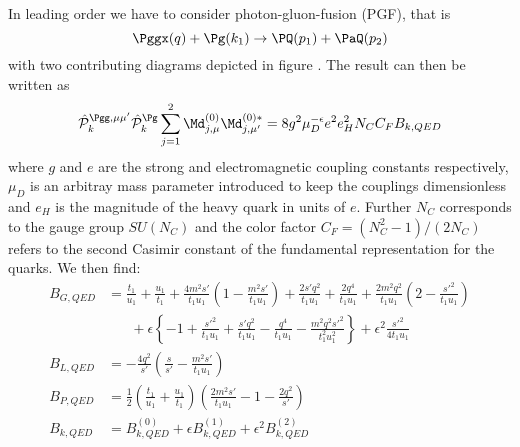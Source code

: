 In leading order we have to consider photon-gluon-fusion (PGF), that is
\begin{equation}
\Pggx(q) + \Pg(k_1) \rightarrow \PQ(p_1)+\PaQ(p_2)
\end{equation}
with two contributing diagrams depicted in figure . The result can then be written as
\begin{equation}
\hat {\mathcal P}_{k}^{\Pgg,\mu\mu'}\hat {\mathcal P}_{k}^{\Pg}\sum_{j=1}^2\Md^{(0)}_{j,\mu}\Md^{(0)*}_{j,\mu'} = 8g^2\mu_D^{-\epsilon}e^2e_H^2 N_C C_F B_{k,QED}
\end{equation}
where $g$ and $e$ are the strong and electromagnetic coupling constants respectively, $\mu_D$ is an arbitray mass parameter introduced to keep the couplings dimensionless and $e_H$ is the magnitude of the heavy quark in units of $e$. Further $N_C$ corresponds to the gauge group $SU(N_C)$ and the color factor $C_F=(N_C^2-1)/(2N_C)$ refers to the second Casimir constant of the fundamental representation for the quarks. We then find:
\begin{align}
B_{G,QED} &= \frac{t_1}{u_1} + \frac{u_1}{t_1} + \frac{4m^2s'}{t_1u_1}\left(1-\frac{m^2s'}{t_1u_1}\right)
+\frac{2s'q^2}{t_1u_1} +\frac{2q^4}{t_1u_1} + \frac{2m^2q^2}{t_1u_1}\left(2-\frac{{s'}^2}{t_1u_1}\right)\nonumber\\
 &\hspace{20pt}+\epsilon\left\{ -1 + \frac{{s'}^2}{t_1u_1} + \frac{s'q^2}{t_1u_1} -
\frac{q^4}{t_1u_1} - \frac{m^2q^2{s'}^2}{t_1^2u_1^2} \right\} + \epsilon^2\frac{{s'}^2}{4t_1u_1}\\
B_{L,QED} &= -\frac{4q^2}{s'}\left(\frac s {s'} - \frac{m^2s'}{t_1u_1}\right)\\
B_{P,QED} &= \frac 1 2\left(\frac{t_1}{u_1}+\frac{u_1}{t_1}\right)\left(\frac{2m^2 s'}{t_1u_1}-1 - \frac{2q^2}{s'}\right)\\
B_{k,QED} &= B^{(0)}_{k,QED} + \epsilon B^{(1)}_{k,QED} + \epsilon^2 B^{(2)}_{k,QED}
\end{align}

